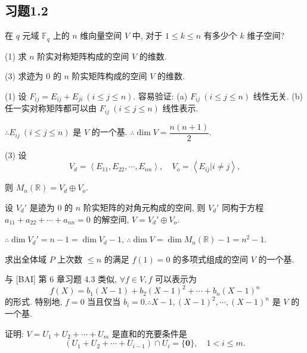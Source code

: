\documentclass[color=black,device=normal,lang=cn,mode=geye]{elegantnote}
\begin{document}
\subsection{习题1.2}
\begin{exercise}%
    在 $q$ 元域 $\mathbb{F}_q$ 上的 $n$ 维向量空间 $V$ 中, 对于 $1\leq k\leq n$ 有多少个 $k$ 维子空间?
\end{exercise}
\begin{solution}
\end{solution}
\begin{exercise}\label{ex2.2}
    (1) 求 $n$ 阶实对称矩阵构成的空间 $V$ 的维数.
    
    (3) 求迹为 $0$ 的 $n$ 阶实矩阵构成的空间 $V$ 的维数.
\end{exercise}
\begin{solution}
    (1) 设 $F_{ij}=E_{ij}+E_{ji}\ (i\leq j\leq n)$. 容易验证: (a) $F_{ij}\ (i\leq j\leq n)$ 线性无关. (b) 任一实对称矩阵都可以由 $F_{ij}\ (i\leq j\leq n)$ 线性表示.
    
    $\therefore E_{ij}\ (i\leq j\leq n)$ 是 $V$ 的一个基. $\therefore\dim V=\dfrac{n(n+1)}{2}$.

    (3) 设
    \[V_d=\left<E_{11},E_{22},\cdots,E_{nn}\right>,\quad V_o=\left<E_{ij}|i\neq j\right>,\]

    则 $M_n(\mathbb{R})=V_d\oplus V_o$.

    设 $V_d'$ 是迹为 $0$ 的 $n$ 阶实矩阵的对角元构成的空间, 则 $V_d'$ 同构于方程 $a_{11}+a_{22}+\cdots+a_{nn}=0$ 的解空间, $V=V_d'\oplus V_o$.
    
    $\therefore\dim V_d'=n-1=\dim V_d-1$, $\therefore\dim V=\dim M_n(\mathbb{R})-1=n^2-1$.
\end{solution}
\begin{exercise}%
    求出全体域 $P$ 上次数 $\leq n$ 的满足 $f(1)=0$ 的多项式组成的空间 $V$ 的一个基.
\end{exercise}
\begin{solution}
    与 [BAI] 第 6 章习题 4.3 类似, $\forall f\in V,f$ 可以表示为
    \[f(X)=b_1(X-1)+b_2(X-1)^2+\cdots+b_n(X-1)^n\]
    的形式. 特别地, $f=0$ 当且仅当 $b_i=0.\therefore X-1,(X-1)^2,\cdots,(X-1)^n$ 是 $V$ 的一个基.
\end{solution}
\begin{exercise}\label{ex2.4}
    证明: $V=U_1+U_2+\cdots+U_m$ 是直和的充要条件是
    \[(U_1+U_2+\cdots+U_{i-1})\cap U_i=\{\boldsymbol{0}\},\quad 1<i\leq m.\]
\end{exercise}
\end{document}
